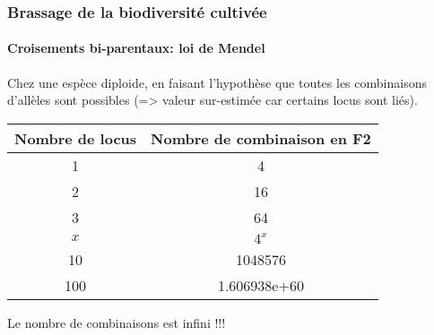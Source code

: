 \begin{frame}
\frametitle{Brassage de la biodiversité cultivée}
\framesubtitle{Croisements bi-parentaux: loi de Mendel}


Chez une espèce diploide, en faisant l'hypothèse que toutes les combinaisons d'allèles sont possibles (=> valeur sur-estimée car certains locus sont liés).

\begin{center}
\begin{tabular}{cc}
\hline
Nombre de locus & Nombre de combinaison en F2 \\
\hline
1 & 4 \\
2 & 16 \\
3 & 64 \\
$x$ & $4^x$ \\
10 & 1048576 \\
100 & 1.606938e+60 \\
\hline
\end{tabular}
\end{center}

\begin{block}{}
\centering\Large
Le nombre de combinaisons est infini !!!
\end{block}


\end{frame}



